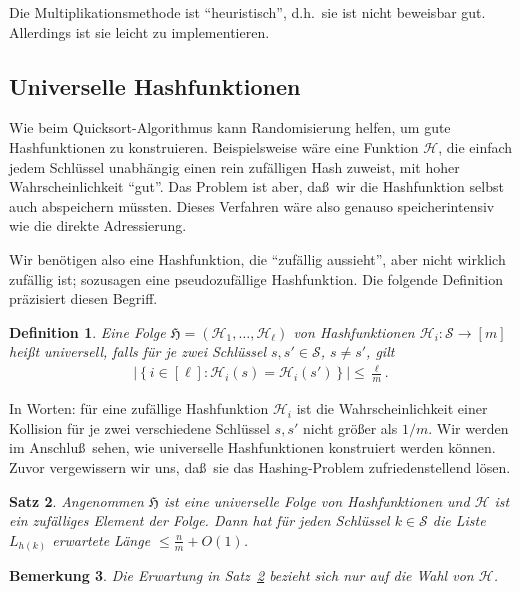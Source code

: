 \documentclass[10pt,reqno]{amsart}
\numberwithin{equation}{section}
\newcommand\cH{\mathcal H}
\newcommand\cS{\mathcal S}
\newcommand\fH{\mathfrak H}
\newtheorem{definition}{Definition}[section]
\newtheorem{remark}[definition]{Bemerkung}
\newtheorem{theorem}[definition]{Satz}
\newcommand\cbc[1]{\left\{{#1}\right\}}
\newcommand\abs[1]{\left|{#1}\right|}
\newcommand\Thm{Satz}
\begin{document}
Die Multiplikationsmethode ist ``heuristisch'', d.h.\ sie ist nicht beweisbar gut.
Allerdings ist sie leicht zu implementieren.

\subsection{Universelle Hashfunktionen}\label{sec_universal}
Wie beim Quicksort-Algorithmus kann Randomisierung helfen, um gute Hashfunktionen zu konstruieren.
Beispielsweise w\"are eine Funktion $\cH$, die einfach jedem Schl\"ussel unabh\"angig einen rein zuf\"alligen Hash zuweist, mit hoher Wahrscheinlichkeit ``gut''.
Das Problem ist aber, da\ss\ wir die Hashfunktion selbst auch abspeichern m\"ussten.
Dieses Verfahren w\"are also genauso speicherintensiv wie die direkte Adressierung.

Wir ben\"otigen also eine Hashfunktion, die ``zuf\"allig aussieht'', aber nicht wirklich zuf\"allig ist; sozusagen eine pseudozuf\"allige Hashfunktion.
Die folgende Definition pr\"azisiert diesen Begriff.

\begin{definition}\label{def_hash}
	Eine Folge $\fH=(\cH_1,\ldots,\cH_\ell)$ von Hashfunktionen $\cH_i:\cS\to[m]$ hei\ss t {\em universell}, falls f\"ur je zwei Schl\"ussel $s,s'\in\cS$, $s\neq s'$, gilt
	\begin{align}\label{eqdef_hash}
		\abs{\cbc{i\in[\ell]:\cH_i(s)=\cH_i(s')}}\leq\frac\ell m.
	\end{align}
\end{definition}

In Worten: f\"ur eine zuf\"allige Hashfunktion $\cH_i$ ist die Wahrscheinlichkeit einer Kollision f\"ur je zwei verschiedene Schl\"ussel $s,s'$ nicht gr\"o\ss er als $1/m$.
Wir werden im Anschlu\ss\ sehen, wie universelle Hashfunktionen konstruiert werden k\"onnen.
Zuvor vergewissern wir uns, da\ss\ sie das Hashing-Problem zufriedenstellend l\"osen.

\begin{theorem}\label{thm_hash}
	Angenommen $\fH$ ist eine universelle Folge von Hashfunktionen und $\cH$ ist ein zuf\"alliges Element der Folge.
	Dann hat f\"ur jeden Schl\"ussel $k\in\cS$ die Liste $L_{h(k)}$ erwartete L\"ange $\leq\frac nm+O(1)$.
\end{theorem}

\begin{remark}\label{rem_hash}
	Die Erwartung in \Thm~\ref{thm_hash} bezieht sich nur auf die Wahl von $\cH$.
\end{remark}
\end{document}
